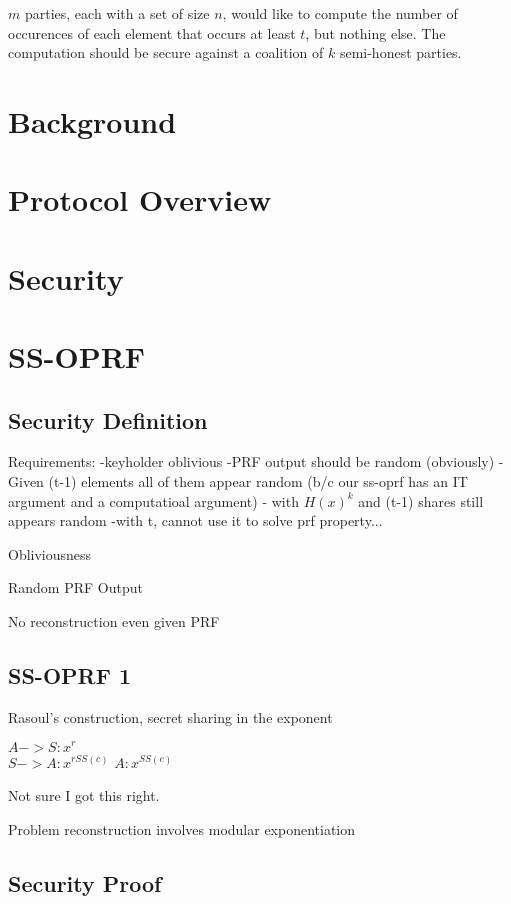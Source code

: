 \documentclass[10pt, sigconf]{acmart}
\begin{document}
$m$ parties, each with a set of size $n$, would like to compute the number of occurences of each element that occurs at least $t$, but nothing else.
The computation should be secure against a coalition of $k$ semi-honest parties.

\section{Background}


\section{Protocol Overview}


\section{Security}



\section{SS-OPRF}

\subsection{Security Definition}


Requirements: 
-keyholder oblivious
-PRF output should be random (obviously)
- Given (t-1) elements all of them appear random (b/c our ss-oprf has an IT argument and a computatioal argument)
- with $H(x)^k$ and (t-1) shares still appears random 
-with t, cannot use it to solve prf property...


Obliviousness

Random PRF Output

No reconstruction even given PRF

\subsection{SS-OPRF 1}

Rasoul's construction, secret sharing in the exponent

$A -> S: x^r$ \\
$S -> A: x^{rSS(c)}$
$A: x^{SS(c)}$

Not sure I got this right.

Problem reconstruction involves modular exponentiation

\subsection{Security Proof}
\end{document}
